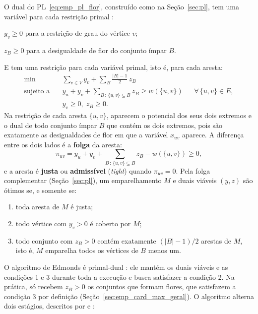 O dual do PL~\eqref{eq:emp_pl_flor}, construído como na Seção~\ref{sec:pl}, tem uma variável para cada restrição primal \cite{schrijver}:
\begin{alineas}
    \item $y_v \ge 0$ para a restrição de grau do vértice $v$;
    \item $z_B \ge 0$ para a desigualdade de flor do conjunto ímpar $B$.
\end{alineas}
E tem uma restrição para cada variável primal, isto é, para cada aresta:
\begin{equation}
    \begin{aligned}
        \min \quad & \sum_{v \in V} y_v + \sum_{B} \frac{|B| - 1}{2}\, z_B \\
        \text{sujeito a} \quad & y_u + y_v + \sum_{B \,:\, \{u,v\} \subseteq B} z_B \ge w(\{u, v\}) && \forall\, \{u, v\} \in E, \\
        & y_v \ge 0, \; z_B \ge 0.
    \end{aligned}
    \label{eq:emp_dual}
\end{equation}
Na restrição de cada aresta $\{u, v\}$, aparecem o potencial dos seus dois extremos e o dual de todo conjunto ímpar $B$ que contém os dois extremos, pois são exatamente as desigualdades de flor em que a variável $x_{uv}$ aparece. A diferença entre os dois lados é a \textbf{folga} da aresta:
\begin{equation}
    \pi_{uv} = y_u + y_v + \sum_{B \,:\, \{u,v\} \subseteq B} z_B - w(\{u, v\}) \ge 0,
    \label{eq:folga_aresta}
\end{equation}
e a aresta é \textbf{justa} ou \textbf{admissível} (\textit{tight}) quando $\pi_{uv} = 0$. Pela folga complementar (Seção~\ref{sec:pl}), um emparelhamento $M$ e duais viáveis $(y, z)$ são ótimos se, e somente se:
\begin{enumerate}
    \item toda aresta de $M$ é justa;
    \item todo vértice com $y_v > 0$ é coberto por $M$;
    \item todo conjunto com $z_B > 0$ contém exatamente $(|B| - 1)/2$ arestas de $M$, isto é, $M$ emparelha todos os vértices de $B$ menos um.
\end{enumerate}

O algoritmo de Edmonds é primal-dual \cite{lawler}: ele mantém os duais viáveis e as condições 1 e 3 durante toda a execução e busca satisfazer a condição 2. Na prática, só recebem $z_B > 0$ os conjuntos que formam flores, que satisfazem a condição 3 por definição (Seção~\ref{sec:emp_card_max_geral}). O algoritmo alterna dois estágios, descritos por  e :

